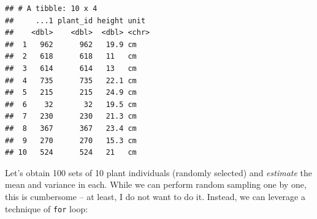 \documentclass[
]{book}
\newenvironment{Shaded}{\begin{snugshade}}{\end{snugshade}}
\newcommand{\AttributeTok}[1]{\textcolor[rgb]{0.77,0.63,0.00}{#1}}
\newcommand{\CommentTok}[1]{\textcolor[rgb]{0.56,0.35,0.01}{\textit{#1}}}
\newcommand{\ConstantTok}[1]{\textcolor[rgb]{0.00,0.00,0.00}{#1}}
\newcommand{\ControlFlowTok}[1]{\textcolor[rgb]{0.13,0.29,0.53}{\textbf{#1}}}
\newcommand{\DecValTok}[1]{\textcolor[rgb]{0.00,0.00,0.81}{#1}}
\newcommand{\FunctionTok}[1]{\textcolor[rgb]{0.00,0.00,0.00}{#1}}
\newcommand{\NormalTok}[1]{#1}
\newcommand{\OtherTok}[1]{\textcolor[rgb]{0.56,0.35,0.01}{#1}}
\newcommand{\SpecialCharTok}[1]{\textcolor[rgb]{0.00,0.00,0.00}{#1}}
\begin{document}
\begin{verbatim}
## # A tibble: 10 x 4
##     ...1 plant_id height unit 
##    <dbl>    <dbl>  <dbl> <chr>
##  1   962      962   19.9 cm   
##  2   618      618   11   cm   
##  3   614      614   13   cm   
##  4   735      735   22.1 cm   
##  5   215      215   24.9 cm   
##  6    32       32   19.5 cm   
##  7   230      230   21.3 cm   
##  8   367      367   23.4 cm   
##  9   270      270   15.3 cm   
## 10   524      524   21   cm
\end{verbatim}

Let's obtain 100 sets of 10 plant individuals (randomly selected) and \emph{estimate} the mean and variance in each. While we can perform random sampling one by one, this is cumbersome -- at least, I do not want to do it. Instead, we can leverage a technique of \texttt{for} loop:

\begin{Shaded}
\end{Shaded}
\end{document}
